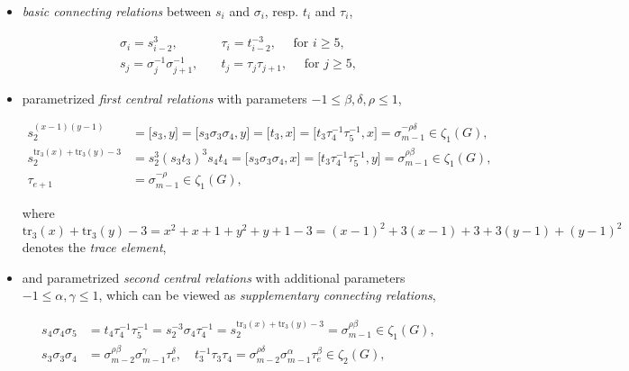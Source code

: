 \documentclass{amsart}
\theoremstyle{definition}
\numberwithin{equation}{section}
\begin{document}
\begin{itemize}
\item
\textit{basic connecting relations} between \(s_i\) and \(\sigma_i\), resp. \(t_i\) and \(\tau_i\),

\begin{equation}
\label{eqn:LowBasicConnectingRel}
\begin{aligned}
\sigma_i=s_{i-2}^3,                 &\quad \tau_i=t_{i-2}^{-3}, \quad \text{ for } i\ge 5, \\
s_j=\sigma_j^{-1}\sigma_{j+1}^{-1}, &\quad t_j=\tau_j\tau_{j+1}, \quad \text{ for } j\ge 5,
\end{aligned}
\end{equation}

\item
parametrized \textit{first central relations} with parameters \(-1\le\beta,\delta,\rho\le 1\),

\begin{equation}
\label{eqn:LowCentralRel}
\begin{aligned}
s_2^{(x-1)(y-1)}                          &=
\lbrack s_3,y\rbrack=\lbrack s_3\sigma_3\sigma_4,y\rbrack=\lbrack t_3,x\rbrack=\lbrack t_3\tau_4^{-1}\tau_5^{-1},x\rbrack=\sigma_{m-1}^{-\rho\delta}\in\zeta_1(G), \\
s_2^{\mathrm{tr}_3(x)+\mathrm{tr}_3(y)-3} &=
s_2^3(s_3t_3)^3s_4t_4=\lbrack s_3\sigma_3\sigma_4,x\rbrack=\lbrack t_3\tau_4^{-1}\tau_5^{-1},y\rbrack=\sigma_{m-1}^{\rho\beta}\in\zeta_1(G), \\
\tau_{e+1}                                &= \sigma_{m-1}^{-\rho}\in\zeta_1(G),
\end{aligned}
\end{equation}

\noindent
where \(\mathrm{tr}_3(x)+\mathrm{tr}_3(y)-3=x^2+x+1+y^2+y+1-3=(x-1)^2+3(x-1)+3+3(y-1)+(y-1)^2\) denotes the \textit{trace element},

\item
and parametrized \textit{second central relations} with additional parameters \(-1\le\alpha,\gamma\le 1\),
which can be viewed as \textit{supplementary connecting relations},

\begin{equation}
\label{eqn:LowSupplConnectingRel}
\begin{aligned}
s_4\sigma_4\sigma_5 &= t_4\tau_4^{-1}\tau_5^{-1} = s_2^{-3}\sigma_4\tau_4^{-1} = s_2^{\mathrm{tr}_3(x)+\mathrm{tr}_3(y)-3}=\sigma_{m-1}^{\rho\beta}\in\zeta_1(G), \\
s_3\sigma_3\sigma_4 &= \sigma_{m-2}^{\rho\beta}\sigma_{m-1}^\gamma\tau_e^\delta, \quad
t_3^{-1}\tau_3\tau_4 = \sigma_{m-2}^{\rho\delta}\sigma_{m-1}^\alpha\tau_e^\beta\in\zeta_2(G),
\end{aligned}
\end{equation}


\end{itemize}
\end{document}
